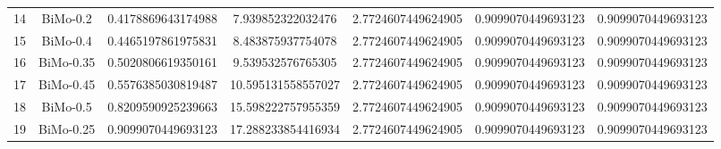 \documentclass[a4paper,10pt]{article}
\begin{document}
\begin{landscape}
\begin{table}[!htp]
\begin{tabular}{ccccccc}
14&BiMo-0.2&0.4178869643174988&7.939852322032476&2.7724607449624905&0.9099070449693123&0.9099070449693123\\
15&BiMo-0.4&0.4465197861975831&8.483875937754078&2.7724607449624905&0.9099070449693123&0.9099070449693123\\
16&BiMo-0.35&0.5020806619350161&9.539532576765305&2.7724607449624905&0.9099070449693123&0.9099070449693123\\
17&BiMo-0.45&0.5576385030819487&10.595131558557027&2.7724607449624905&0.9099070449693123&0.9099070449693123\\
18&BiMo-0.5&0.8209590925239663&15.598222757955359&2.7724607449624905&0.9099070449693123&0.9099070449693123\\
19&BiMo-0.25&0.9099070449693123&17.288233854416934&2.7724607449624905&0.9099070449693123&0.9099070449693123\\
\hline
\end{tabular}
\end{table}


\end{landscape}
\end{document}
